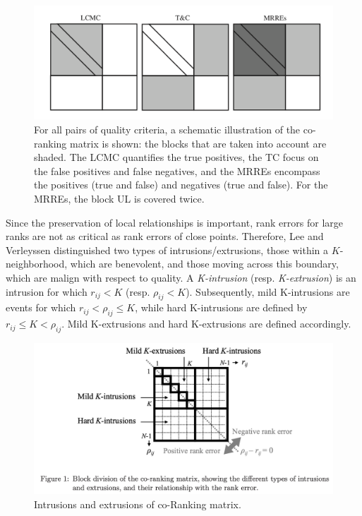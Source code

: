 \documentclass[11pt,a4paper,]{article}
\begin{document}
\begin{figure}

{\centering \includegraphics[width=1\linewidth]{figures/coRanking3} 

}

\caption{For all pairs of quality criteria, a schematic illustration of the co-ranking matrix is shown: the blocks that are taken into account are shaded. The LCMC quantifies the true positives, the TC focus on the false positives and false negatives, and the MRREs encompass the positives (true and false) and negatives (true and false). For the MRREs, the block UL is covered twice.}\label{fig:matrix}
\end{figure}

Since the preservation of local relationships is important, rank errors for large ranks are not as critical as rank errors of close points.
Therefore, Lee and Verleyssen distinguished two types of intrusions/extrusions, those within a \(K\)-neighborhood, which are benevolent, and those moving across this boundary, which are malign with respect to quality.
A \emph{K-intrusion} (resp. \emph{K-extrusion}) is an intrusion for which \(r_{ij} < K\) (resp. \(\rho_{ij} < K\)).
Subsequently, mild K-intrusions are events for which \(r_{ij} < \rho_{ij} \leq K\), while hard K-intrusions are defined by \(r_{ij} \leq K < \rho_{ij}\). Mild K-extrusions and hard K-extrusions are defined accordingly.

\begin{figure}

{\centering \includegraphics[width=1\linewidth]{figures/coRanking2} 

}

\caption{Intrusions and extrusions of co-Ranking matrix.}\label{fig:Kins}
\end{figure}
\end{document}

